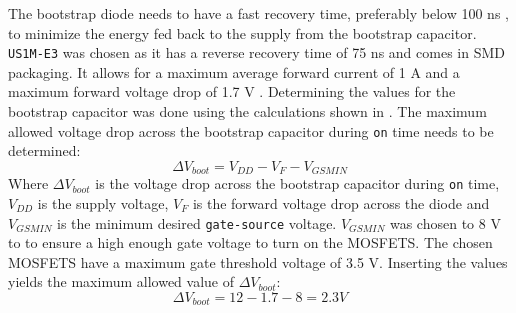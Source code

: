 The bootstrap diode needs to have a fast recovery time, preferably below 100 ns \cite{bootstrap_infineon}, to minimize the energy fed back to the supply from the bootstrap capacitor.
\texttt{US1M-E3} \cite{diode_ds} was chosen as it has a reverse recovery time of 75 ns and comes in SMD packaging. 
It allows for a maximum average forward current of 1 A and a maximum forward voltage drop of 1.7 V \cite{diode_ds}.
Determining the values for the bootstrap capacitor was done using the calculations shown in \cite{bootstrap_ON}.
The maximum allowed voltage drop across the bootstrap capacitor during \texttt{on} time needs to be determined: 
\begin{equation}
\Delta V_{boot} = V_{DD} - V_{F} - V_{GSMIN}
\end{equation}
Where $\Delta V_{boot}$ is the voltage drop across the bootstrap capacitor during \texttt{on} time, $V_{DD}$ is the supply voltage, $V_F$ is the forward voltage drop across the diode and $V_{GSMIN}$ is the minimum desired \texttt{gate-source} voltage.
$V_{GSMIN}$ was chosen to 8 V to to ensure a high enough gate voltage to turn on the MOSFETS. 
The chosen MOSFETS have a maximum gate threshold voltage of 3.5 V. 
Inserting the values yields the maximum allowed value of $\Delta V_{boot}$:
\begin{equation}
\Delta V_{boot} = 12 - 1.7 - 8 = 2.3 V	
\end{equation}


